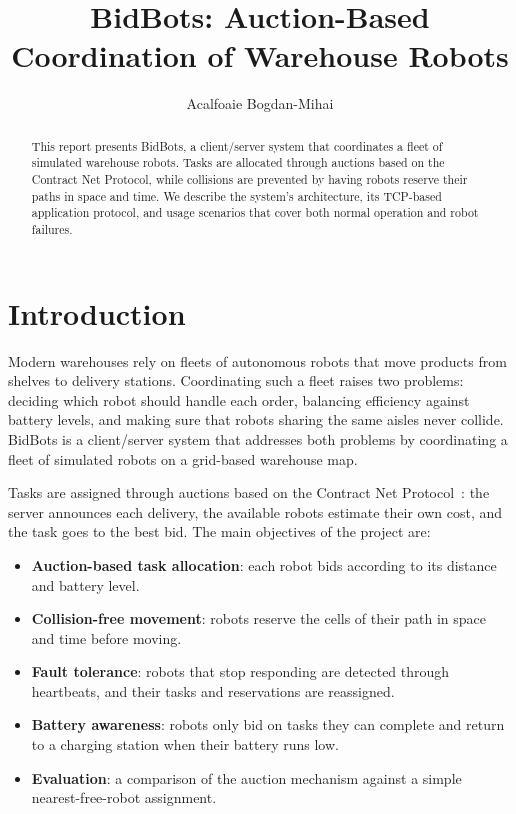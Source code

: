 \documentclass[runningheads]{llncs}
\begin{document}
%
\title{BidBots: Auction-Based Coordination of Warehouse Robots}

\author{Acalfoaie Bogdan-Mihai}


\maketitle

\begin{abstract}
This report presents BidBots, a client/server system that coordinates a
fleet of simulated warehouse robots. Tasks are allocated through auctions
based on the Contract Net Protocol, while collisions are prevented by having
robots reserve their paths in space and time. We describe the system's
architecture, its TCP-based application protocol, and usage scenarios
that cover both normal operation and robot failures.

\end{abstract}

\section{Introduction}
Modern warehouses rely on fleets of autonomous robots that move products from shelves to delivery stations. Coordinating such a fleet raises two problems: deciding which robot should handle each order, balancing efficiency against battery levels, and making sure that robots sharing the same aisles never collide. BidBots is a client/server system that addresses both problems by coordinating a fleet of simulated robots on a grid-based warehouse map.

Tasks are assigned through auctions based on the Contract Net Protocol~\cite{cnp}: the server announces each delivery, the available robots estimate their own cost, and the task goes to the best bid. The main objectives of the project are:

\begin{itemize}
  \item \textbf{Auction-based task allocation}: each robot bids according to its distance and battery level.
  \item \textbf{Collision-free movement}: robots reserve the cells of their path in space and time before moving.
  \item \textbf{Fault tolerance}: robots that stop responding are detected through heartbeats, and their tasks and reservations are reassigned.
  \item \textbf{Battery awareness}: robots only bid on tasks they can complete and return to a charging station when their battery runs low.
  \item \textbf{Evaluation}: a comparison of the auction mechanism against a simple nearest-free-robot assignment.
\end{itemize}
\end{document}
